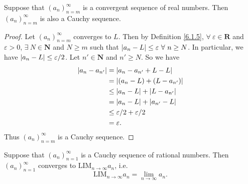 \begin{proposition}\label{6.1.12}
    Suppose that \((a_n)_{n = m}^\infty\) is a convergent sequence of real numbers.
    Then \((a_n)_{n = m}^\infty\) is also a Cauchy sequence.
\end{proposition}

\begin{proof}
    Let \((a_n)_{n = m}^\infty\) converges to \(L\).
    Then by Definition \ref{6.1.5}, \(\forall\ \varepsilon \in \mathbf{R}\) and \(\varepsilon > 0\), \(\exists\ N \in \mathbf{N}\) and \(N \geq m\) such that \(\abs*{a_n - L} \leq \varepsilon \ \forall\ n \geq N\).
    In particular, we have \(\abs*{a_n - L} \leq \varepsilon / 2\).
    Let \(n' \in \mathbf{N}\) and \(n' \geq N\).
    So we have
    \begin{align*}
        \abs*{a_n - a_{n'}} & = \abs*{a_n - a_{n'} + L - L}           \\
                            & = \abs*{(a_n - L) + (L - a_{n'})}       \\
                            & \leq \abs*{a_n - L} + \abs*{L - a_{n'}} \\
                            & = \abs*{a_n - L} + \abs*{a_{n'} - L}    \\
                            & \leq \varepsilon / 2 + \varepsilon / 2  \\
                            & = \varepsilon.
    \end{align*}
    Thus \((a_n)_{n = m}^\infty\) is a Cauchy sequence.
\end{proof}

\setcounter{theorem}{14}
\begin{proposition}\label{6.1.15}
    Suppose that \((a_n)_{n = 1}^\infty\) is a Cauchy sequence of rational numbers.
    Then \((a_n)_{n = 1}^\infty\) converges to \(\text{LIM}_{n \to \infty} a_n\), i.e.
    \[
        \text{LIM}_{n \to \infty} a_n = \lim_{n \to \infty} a_n.
    \]
\end{proposition}

